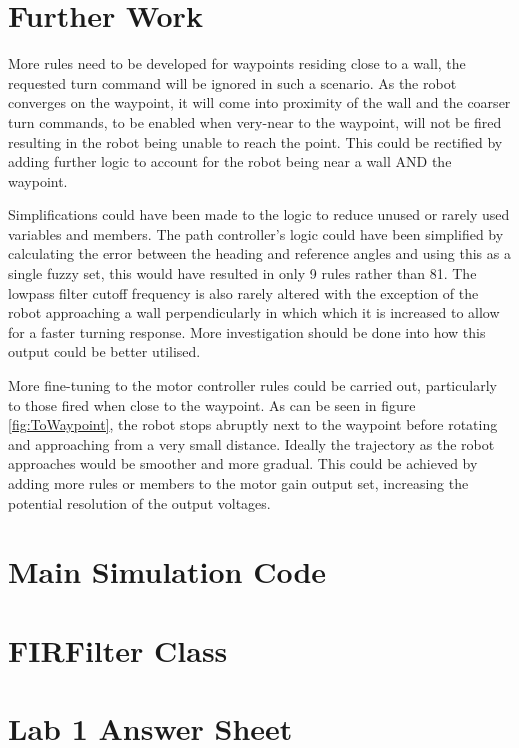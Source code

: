 \documentclass[10pt]{article}
\begin{document}
\section{Further Work}
More rules need to be developed for waypoints residing close to a wall, the requested turn command will be ignored in such a scenario.
As the robot converges on the waypoint, it will come into proximity of the wall and the coarser turn commands, to be enabled when very-near to the waypoint, will not be fired resulting in the robot being unable to reach the point.
This could be rectified by adding further logic to account for the robot being near a wall AND the waypoint. 

\medskip
Simplifications could have been made to the logic to reduce unused or rarely used variables and members. 
The path controller's logic could have been simplified by calculating the error between the heading and reference angles and using this as a single fuzzy set, this would have resulted in only 9 rules rather than 81. 
The lowpass filter cutoff frequency is also rarely altered with the exception of the robot approaching a wall perpendicularly in which which it is increased to allow for a faster turning response.
More investigation should be done into how this output could be better utilised. 

\medskip
More fine-tuning to the motor controller rules could be carried out, particularly to those fired when close to the waypoint.
As can be seen in figure \ref{fig:ToWaypoint}, the robot stops abruptly next to the waypoint before rotating and approaching from a very small distance.
Ideally the trajectory as the robot approaches would be smoother and more gradual.
This could be achieved by adding more rules or members to the motor gain output set, increasing the potential resolution of the output voltages.  

\pagebreak



\pagebreak
\appendix
\section{Main Simulation Code}

\pagebreak
\section{FIRFilter Class}

\section{Lab 1 Answer Sheet}
\end{document}

